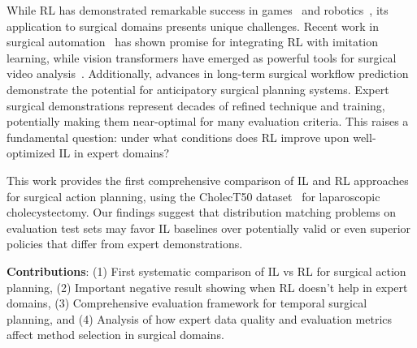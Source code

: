 \documentclass[runningheads]{llncs}
\begin{document}
While RL has demonstrated remarkable success in games~\cite{mnih2015human} and robotics~\cite{levine2016end}, its application to surgical domains presents unique challenges. Recent work in surgical automation~\cite{liu2024surgical} has shown promise for integrating RL with imitation learning, while vision transformers have emerged as powerful tools for surgical video analysis~\cite{wagner2023vision,liu2023skit,liu2025lovit}. Additionally, advances in long-term surgical workflow prediction~\cite{boels2025swag} demonstrate the potential for anticipatory surgical planning systems. Expert surgical demonstrations represent decades of refined technique and training, potentially making them near-optimal for many evaluation criteria. This raises a fundamental question: under what conditions does RL improve upon well-optimized IL in expert domains?

This work provides the first comprehensive comparison of IL and RL approaches for surgical action planning, using the CholecT50 dataset~\cite{nwoye2022cholect50} for laparoscopic cholecystectomy. Our findings suggest that distribution matching problems on evaluation test sets may favor IL baselines over potentially valid or even superior policies that differ from expert demonstrations.

\textbf{Contributions}: (1) First systematic comparison of IL vs RL for surgical action planning, (2) Important negative result showing when RL doesn't help in expert domains, (3) Comprehensive evaluation framework for temporal surgical planning, and (4) Analysis of how expert data quality and evaluation metrics affect method selection in surgical domains.

\end{document}
